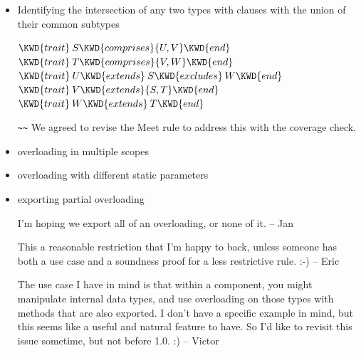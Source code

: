 \begin{itemize}
\item Identifying the intersection of any two types with  clauses with the union of their common subtypes

\begin{Fortress}
\(\KWD{trait}\:S \KWD{comprises} \{U, V\} \KWD{end}\)\\
\(\KWD{trait}\:T \KWD{comprises} \{V, W\} \KWD{end}\)\\
\(\KWD{trait}\:U \KWD{extends}\:S \KWD{excludes}\:W \KWD{end}\)\\
\(\KWD{trait}\:V \KWD{extends} \{S, T\} \KWD{end}\)\\
\(\KWD{trait}\:W \KWD{extends}\:T \KWD{end}\)
\end{Fortress}

 \verb+~~+ 
We agreed to revise the Meet rule to address this with the coverage check.

  \item overloading in multiple scopes
  \item overloading with different static parameters
  \item exporting partial overloading

I'm hoping we export all of an overloading, or none of it. -- Jan

This a reasonable restriction that I'm happy to back, unless someone
has both a use case and a soundness proof for a less restrictive
rule. :-) -- Eric

The use case I have in mind is that within a component, you might
manipulate internal data types, and use overloading on those types
with methods that are also exported.  I don't have a specific example
in mind, but this seems like a useful and natural feature to have.  So
I'd like to revisit this issue sometime, but not before 1.0. :) -- Victor

\end{itemize}


